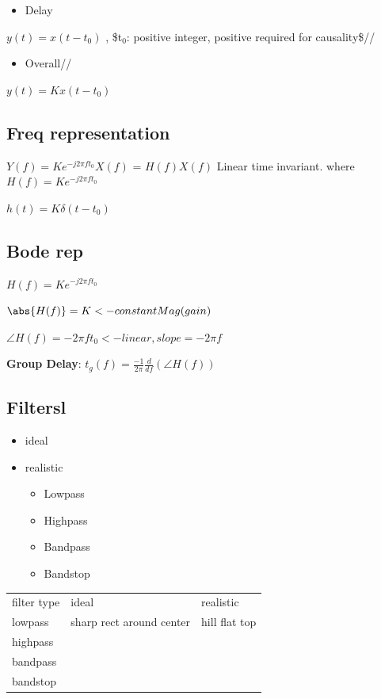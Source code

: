 \documentclass[11pt]{article}
\begin{document}
\begin{itemize}
\item Delay \\
\end{itemize}
$y(t) = x(t-t_0)$ , \$t$_{\text{0}}$: positive integer, positive required for causality\$//

\begin{itemize}
\item Overall//
\end{itemize}
$y(t) = K x(t-t_0)$

\subsection{Freq representation}
\label{sec-2-2}

$Y(f)  = K e^{-j2\pi ft_0} X(f)$
  = $H(f)X(f)$ Linear time invariant.
where $H(f) = Ke^{-j2\pi ft_0}$

$h(t) = K\delta(t-t_0)$

\subsection{Bode rep}
\label{sec-2-3}
$H(f) = Ke^{-j2\pi ft_0}$

$\abs{H(f)} = K <- constant Mag(gain)$

$\angle{H(f)} = -2\pi ft_0 <- linear, slope = -2\pi f$


\textbf{Group Delay}: $t_g(f) = \frac{-1}{2\pi} \frac{d}{df}(\angle{H(f)})$

\subsection{Filtersl}
\label{sec-2-4}
\begin{itemize}
\item ideal\\
\item realistic
\begin{itemize}
\item Lowpass
\item Highpass
\item Bandpass
\item Bandstop
\end{itemize}
\end{itemize}

\begin{center}
\begin{tabular}{lll}
filter type & ideal & realistic\\
lowpass & sharp rect around center & hill flat top\\
highpass &  & \\
bandpass &  & \\
bandstop &  & \\
\end{tabular}
\end{center}
\end{document}
